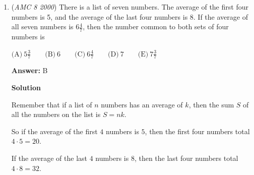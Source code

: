 \begin{enumerate}
 The total surface area is therefore $24 + 6 - 1 - 1 = 28$ square units.

 The percent increase in surface area is $\frac{SA_{new} - SA_{old}}{SA_{old}}\cdot 100\% = \frac{28-24}{24}\cdot 100\% \approx 16.67\%$, giving the closest answer as $\boxed{C}$.

 



\textbf{Solution 2(Similar to 1)}

The original cube has $6$ faces, each with an area of $2\cdot 2 = 4$ square units.  Thus the original figure had a total surface area of $4$ times $6$ square units. Notice that the little cube covers a bit of the larger cube but this is replaced by the top of the little cube. Therefore, the actual increase comes from the four sides of the cube giving $1$ squared = $1$, $1$ ($4$) = $4$. So $4$ over the original $4$ times $6$. 4/4(6) = 1/6which is about 16.67\% giving $\boxed{C}$..

 



\textbf{Solution 3}

To be honest, we could just bash this one out to get about 20\%, which is C. Yaaaay! BRO, who ever made this is tweaking, if you bashed it to 20 you would choose D so this is not bashable. Tsk Tsk  Plus they never said how to bash¯\_()D is closer to 20 sir lock in

 


	\item (\textit{AMC 8 2000}) There is a list of seven numbers. The average of the first four numbers is 5, and the average of the last four numbers is 8. If the average of all seven numbers is $6\frac{4}{7}$, then the number common to both sets of four numbers is


 $\text{(A)}\ 5\frac{3}{7} \qquad \text{(B)}\ 6 \qquad \text{(C)}\ 6\frac{4}{7} \qquad \text{(D)}\ 7 \qquad \text{(E)}\ 7\frac{3}{7}$

 \textbf{Answer: }B



\textbf{Solution}

Remember that if a list of $n$ numbers has an average of $k$, then the sum $S$ of all the numbers on the list is $S = nk$.

 So if the average of the first $4$ numbers is $5$, then the first four numbers total $4 \cdot 5 = 20$.

 If the average of the last $4$ numbers is $8$, then the last four numbers total $4 \cdot 8 = 32$.


\end{enumerate}
